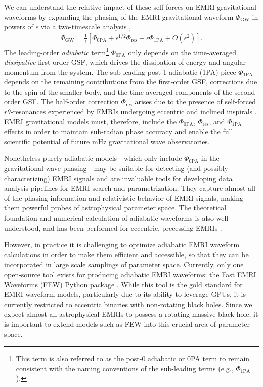 \documentclass[%
 reprint,
 nofootinbib,
 amsmath,amssymb,
 aps,
 prd,
]{revtex4-2}
\begin{document}
We can understand the relative impact of these self-forces on EMRI gravitational waveforms by expanding the phasing of the EMRI gravitational waveform $\Phi_\mathrm{GW}$ in powers of $\epsilon$ via a two-timescale analysis \cite{HindFlan08},
\begin{align} \label{eqn:twotimescale}
\Phi_\mathrm{GW} = \frac{1}{\epsilon} \left[ \Phi_\mathrm{0PA} + \epsilon^{1/2} \Phi_\mathrm{res} + \epsilon \Phi_\mathrm{1PA} + O(\epsilon^2)\right].
\end{align}
The leading-order \emph{adiabatic} term\footnote{This term is also referred to as the post-0 adiabatic or 0PA term to remain consistent with the naming conventions of the sub-leading terms (e.g., $\Phi_\mathrm{1PA}$).} $\Phi_\mathrm{0PA}$ only depends on the time-averaged \emph{dissipative} first-order GSF, which drives the dissipation of energy and angular momentum from the system. The sub-leading post-1 adiabatic (1PA) piece $\Phi_\mathrm{1PA}$ depends on the remaining contributions from the first-order GSF, corrections due to the spin of the smaller body, and the time-averaged components of the second-order GSF. The half-order correction $\Phi_\mathrm{res}$ arises due to the presence of self-forced $r\theta$-resonances experienced by EMRIs undergoing eccentric and inclined inspirals \cite{FlanHind12}. EMRI gravitational models must, therefore, include the $\Phi_\mathrm{0PA}$, $\Phi_\mathrm{res}$, and $\Phi_\mathrm{1PA}$ effects in order to maintain sub-radian phase accuracy and enable the full scientific potential of future mHz gravitational wave observatories. 

Nonetheless purely adiabatic models---which only include $\Phi_\mathrm{0PA}$ in the gravitational wave phasing---may be suitable for detecting (and possibly characterizing) EMRI signals and are invaluable tools for developing data analysis pipelines for EMRI search and parametrization. They capture almost all of the phasing information and relativistic behavior of EMRI signals, making them powerful probes of astrophysical parameter space. The theoretical foundation and numerical calculation of adiabatic waveforms is also well understood, and has been performed for eccentric, precessing EMRIs \cite{HughETC21}.

However, in practice it is challenging to optimize adiabatic EMRI waveform calculations in order to make them efficient and accessible, so that they can be incorporated in large scale samplings of parameter space. Currently, only one open-source tool exists for producing adiabatic EMRI waveforms: the Fast EMRI Waveforms (FEW) Python package \cite{ChuaGallVall19, ChuaETC20, KatzETC20, KatzETC21}. While this tool is the gold standard for EMRI waveform models, particularly due to its ability to leverage GPUs, it is currently restricted to eccentric binaries with non-rotating black holes. Since we expect almost all astrophysical EMRIs to possess a rotating massive black hole, it is important to extend models such as FEW into this crucial area of parameter space.
\end{document}
